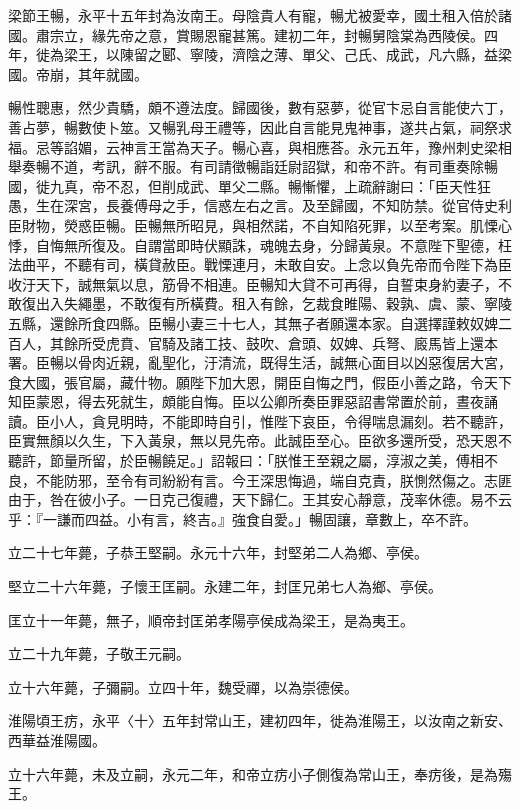 \begin{pinyinscope}
梁節王暢，永平十五年封為汝南王。母陰貴人有寵，暢尤被愛幸，國土租入倍於諸國。肅宗立，緣先帝之意，賞賜恩寵甚篤。建初二年，封暢舅陰棠為西陵侯。四年，徙為梁王，以陳留之郾、寧陵，濟陰之薄、單父、己氏、成武，凡六縣，益梁國。帝崩，其年就國。

暢性聰惠，然少貴驕，頗不遵法度。歸國後，數有惡夢，從官卞忌自言能使六丁，善占夢，暢數使卜筮。又暢乳母王禮等，因此自言能見鬼神事，遂共占氣，祠祭求福。忌等諂媚，云神言王當為天子。暢心喜，與相應荅。永元五年，豫州刺史梁相舉奏暢不道，考訊，辭不服。有司請徵暢詣廷尉詔獄，和帝不許。有司重奏除暢國，徙九真，帝不忍，但削成武、單父二縣。暢慚懼，上疏辭謝曰：「臣天性狂愚，生在深宮，長養傅母之手，信惑左右之言。及至歸國，不知防禁。從官侍史利臣財物，熒惑臣暢。臣暢無所昭見，與相然諾，不自知陷死罪，以至考案。肌慄心悸，自悔無所復及。自謂當即時伏顯誅，魂魄去身，分歸黃泉。不意陛下聖德，枉法曲平，不聽有司，橫貸赦臣。戰慄連月，未敢自安。上念以負先帝而令陛下為臣收汙天下，誠無氣以息，筋骨不相連。臣暢知大貸不可再得，自誓束身約妻子，不敢復出入失繩墨，不敢復有所橫費。租入有餘，乞裁食睢陽、穀孰、虞、蒙、寧陵五縣，還餘所食四縣。臣暢小妻三十七人，其無子者願還本家。自選擇謹敕奴婢二百人，其餘所受虎賁、官騎及諸工技、鼓吹、倉頭、奴婢、兵弩、廄馬皆上還本署。臣暢以骨肉近親，亂聖化，汙清流，既得生活，誠無心面目以凶惡復居大宮，食大國，張官屬，藏什物。願陛下加大恩，開臣自悔之門，假臣小善之路，令天下知臣蒙恩，得去死就生，頗能自悔。臣以公卿所奏臣罪惡詔書常置於前，晝夜誦讀。臣小人，貪見明時，不能即時自引，惟陛下哀臣，令得喘息漏刻。若不聽許，臣實無顏以久生，下入黃泉，無以見先帝。此誠臣至心。臣欲多還所受，恐天恩不聽許，節量所留，於臣暢饒足。」詔報曰：「朕惟王至親之屬，淳淑之美，傅相不良，不能防邪，至令有司紛紛有言。今王深思悔過，端自克責，朕惻然傷之。志匪由于，咎在彼小子。一日克己復禮，天下歸仁。王其安心靜意，茂率休德。易不云乎：『一謙而四益。小有言，終吉。』強食自愛。」暢固讓，章數上，卒不許。

立二十七年薨，子恭王堅嗣。永元十六年，封堅弟二人為鄉、亭侯。

堅立二十六年薨，子懷王匡嗣。永建二年，封匡兄弟七人為鄉、亭侯。

匡立十一年薨，無子，順帝封匡弟孝陽亭侯成為梁王，是為夷王。

立二十九年薨，子敬王元嗣。

立十六年薨，子彌嗣。立四十年，魏受禪，以為崇德侯。

淮陽頃王疠，永平〈十〉五年封常山王，建初四年，徙為淮陽王，以汝南之新安、西華益淮陽國。

立十六年薨，未及立嗣，永元二年，和帝立疠小子側復為常山王，奉疠後，是為殤王。


\end{pinyinscope}
